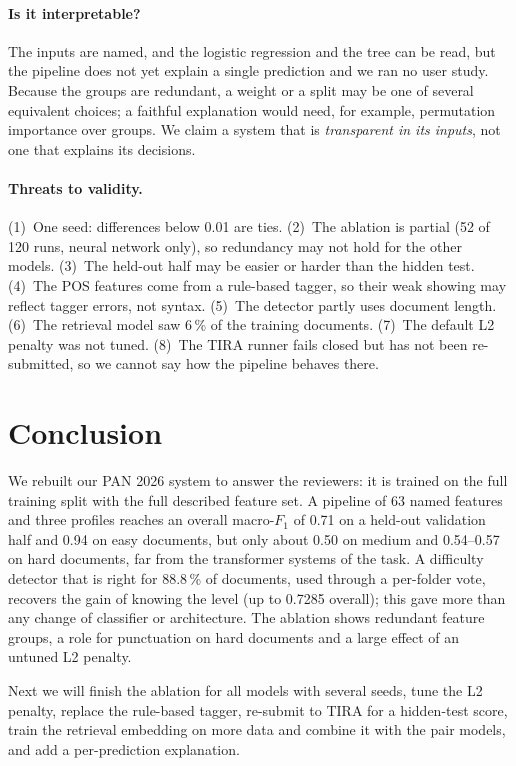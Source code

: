 \documentclass[runningheads]{llncs}
\begin{document}
\paragraph{Is it interpretable?} The inputs are named, and the logistic regression and the tree can be read, but the pipeline does not yet explain a single prediction and we ran no user study. Because the groups are redundant, a weight or a split may be one of several equivalent choices; a faithful explanation would need, for example, permutation importance over groups. We claim a system that is \emph{transparent in its inputs}, not one that explains its decisions.

\paragraph{Threats to validity.} (1)~One seed: differences below 0.01 are ties. (2)~The ablation is partial (52 of 120 runs, neural network only), so redundancy may not hold for the other models. (3)~The held-out half may be easier or harder than the hidden test. (4)~The POS features come from a rule-based tagger, so their weak showing may reflect tagger errors, not syntax. (5)~The detector partly uses document length. (6)~The retrieval model saw 6\,\% of the training documents. (7)~The default L2 penalty was not tuned. (8)~The TIRA runner fails closed but has not been re-submitted, so we cannot say how the pipeline behaves there.

\section{Conclusion}

We rebuilt our PAN 2026 system to answer the reviewers: it is trained on the full training split with the full described feature set. A pipeline of 63 named features and three profiles reaches an overall macro-$F_1$ of 0.71 on a held-out validation half and 0.94 on easy documents, but only about 0.50 on medium and 0.54--0.57 on hard documents, far from the transformer systems of the task. A difficulty detector that is right for 88.8\,\% of documents, used through a per-folder vote, recovers the gain of knowing the level (up to 0.7285 overall); this gave more than any change of classifier or architecture. The ablation shows redundant feature groups, a role for punctuation on hard documents and a large effect of an untuned L2 penalty.

Next we will finish the ablation for all models with several seeds, tune the L2 penalty, replace the rule-based tagger, re-submit to TIRA for a hidden-test score, train the retrieval embedding on more data and combine it with the pair models, and add a per-prediction explanation.



\end{document}
